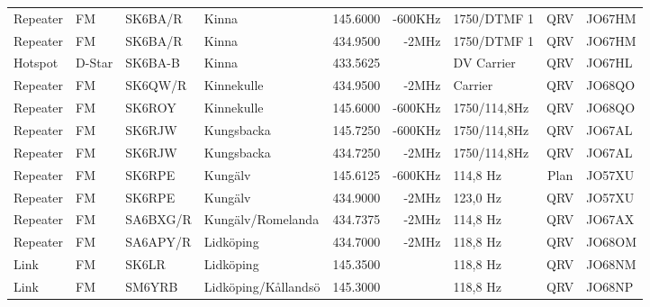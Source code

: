 \begin{landscape}
\begin{longtable}{llllrrlcl}
	Repeater          & FM           & SK6BA/R       & Kinna               &          145.6000 &        -600KHz & 1750/DTMF 1     &       QRV       & JO67HM           \\
	Repeater          & FM           & SK6BA/R       & Kinna               &          434.9500 &          -2MHz & 1750/DTMF 1     &       QRV       & JO67HM           \\
	Hotspot           & D-Star       & SK6BA-B       & Kinna               &          433.5625 &                & DV Carrier      &       QRV       & JO67HL           \\
	Repeater          & FM           & SK6QW/R       & Kinnekulle          &          434.9500 &          -2MHz & Carrier         &       QRV       & JO68QO           \\
	Repeater          & FM           & SK6ROY        & Kinnekulle          &          145.6000 &        -600KHz & 1750/114,8Hz    &       QRV       & JO68QO           \\
	Repeater          & FM           & SK6RJW        & Kungsbacka          &          145.7250 &        -600KHz & 1750/114,8Hz    &       QRV       & JO67AL           \\
	Repeater          & FM           & SK6RJW        & Kungsbacka          &          434.7250 &          -2MHz & 1750/114,8Hz    &       QRV       & JO67AL           \\
	Repeater          & FM           & SK6RPE        & Kungälv             &          145.6125 &        -600KHz & 114,8 Hz        &      Plan       & JO57XU           \\
	Repeater          & FM           & SK6RPE        & Kungälv             &          434.9000 &          -2MHz & 123,0 Hz        &       QRV       & JO57XU           \\
	Repeater          & FM           & SA6BXG/R      & Kungälv/Romelanda   &          434.7375 &          -2MHz & 114,8 Hz        &       QRV       & JO67AX           \\
	Repeater          & FM           & SA6APY/R      & Lidköping           &          434.7000 &          -2MHz & 118,8 Hz        &       QRV       & JO68OM           \\
	Link              & FM           & SK6LR         & Lidköping           &          145.3500 &                & 118,8 Hz        &       QRV       & JO68NM           \\
	Link              & FM           & SM6YRB        & Lidköping/Kållandsö &          145.3000 &                & 118,8 Hz        &       QRV       & JO68NP           \\

\end{longtable}
\end{landscape}
